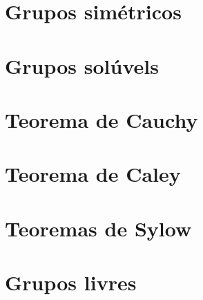\section{Grupos simétricos}

\section{Grupos solúvels}

\section{Teorema de Cauchy}

\section{Teorema de Caley}

\section{Teoremas de Sylow}

\section{Grupos livres}

